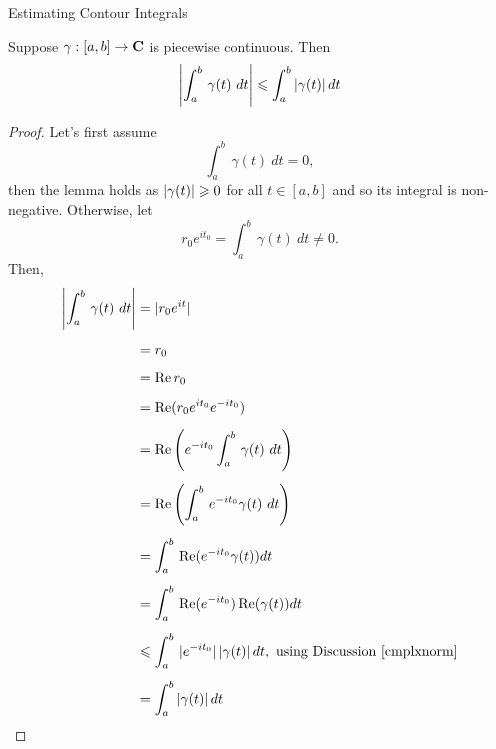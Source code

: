 \vspace*{1em}

\begin{mdframed}
\begin{center}
{\Large Estimating Contour Integrals}
\end{center}
\end{mdframed}

\begin{lemma}\label{intriineq}
Suppose $\gamma:[a,b] \to \mathbf C$ is piecewise continuous. Then
\[\abs{\int_a^b\,\gamma(t)\ dt} \leq \int_a^b\abs{\gamma(t)}dt\]
\end{lemma}
\begin{proof}
Let's first assume 
\[\int_a^b\,\gamma(t)\ dt = 0,\]
then the lemma holds as $\left\lvert\gamma(t)\right\rvert \geqslant 0$ for all $t \in [a,b]$ and so its integral is non-negative. Otherwise, let
\[r_0e^{it_0} = \int_a^b\,\gamma(t)\ dt \neq 0.\]
Then,
\begin{align*}
\left\lvert\int_a^b\,\gamma(t)\ dt\right\rvert &= |r_0e^{it}|\\[0.5em]
&= r_0\\[0.5em]
&= \operatorname{Re} r_0\\[0.5em]
&= \operatorname{Re} (r_0e^{it_0}e^{-it_0})\\[0.5em]
&= \operatorname{Re} \left(e^{-it_0}\int_a^b\,\gamma(t)\ dt\right)\\[0.5em]
&= \operatorname{Re} \left(\int_a^b\,e^{-it_0}\gamma(t)\ dt\right)\\[0.5em]
&= \int_a^b\,\operatorname{Re} (e^{-it_0}\gamma(t)) dt\\[0.5em]
&= \int_a^b\,\operatorname{Re} (e^{-it_0})\operatorname{Re}(\gamma(t)) dt\\[0.5em]
&\leqslant \int_a^b\,|e^{-it_0}|\left\lvert\gamma(t)\right\rvert dt,\ \text{using Discussion \ref{cmplxnorm}}\\[0.5em]
&= \int_a^b\left\lvert\gamma(t)\right\rvert dt
\end{align*}
\end{proof}

\vspace*{1em}

